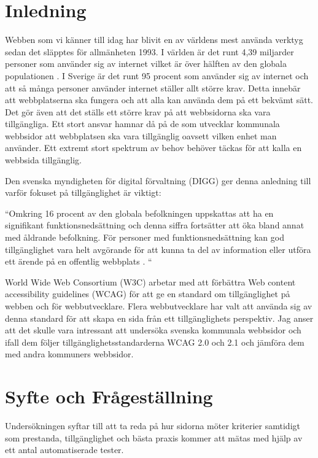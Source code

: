 \documentclass[11p]{article}
\begin{document}
    \newpage
    \tableofcontents

    \setlength{\parindent}{0pt}
    \setlength{\parskip}{10pt}

    
    \section{Inledning}
    Webben som vi känner till idag har blivit en av världens mest använda verktyg sedan det släpptes för allmänheten 1993.
    I världen är det runt 4,39 miljarder personer som använder sig av internet vilket är över hälften av den globala populationen \textcite{history_WWW}.
    I Sverige är det runt 95 procent som använder sig av internet \textcite{SCB} och att så många personer använder internet ställer allt större krav.
    Detta innebär att webbplatserna ska fungera och att alla kan använda dem på ett bekvämt sätt.
    Det gör även att det ställs ett större krav på att webbsidorna ska vara tillgängliga.
    Ett stort ansvar hamnar då på de som utvecklar kommunala webbsidor att webbplatsen ska vara tillgänglig oavsett vilken enhet man använder.
    Ett extremt stort spektrum av behov behöver täckas för att kalla en webbsida tillgänglig.

    Den svenska myndigheten för digital förvaltning (DIGG) ger denna anledning till varför fokuset på tillgänglighet är viktigt:

    ``Omkring 16 procent av den globala befolkningen uppskattas att ha en signifikant funktionsnedsättning och denna siffra fortsätter att öka bland annat med åldrande befolkning.
    För personer med funktionsnedsättning kan god tillgänglighet vara helt avgörande för att kunna ta del av information eller utföra ett ärende på en offentlig webbplats \textcite{Digg_tillganglighet}.
    ``

    World Wide Web Consortium (W3C) arbetar med att förbättra Web content accessibility guidelines (WCAG) för att ge en standard om tillgänglighet på webben och för webbutvecklare.
    Flera webbutvecklare har valt att använda sig av denna standard för att skapa en sida från ett tillgänglighets perspektiv.
    Jag anser att det skulle vara intressant att undersöka svenska kommunala webbsidor och ifall dem följer tillgänglighetsstandarderna WCAG 2.0 och 2.1 och jämföra dem med andra kommuners webbsidor.
    
    \section{Syfte och Frågeställning}
    Undersökningen syftar till att ta reda på hur sidorna möter kriterier samtidigt som prestanda, tillgänglighet och bästa praxis kommer att mätas med hjälp av ett antal automatiserade tester.
\end{document}
